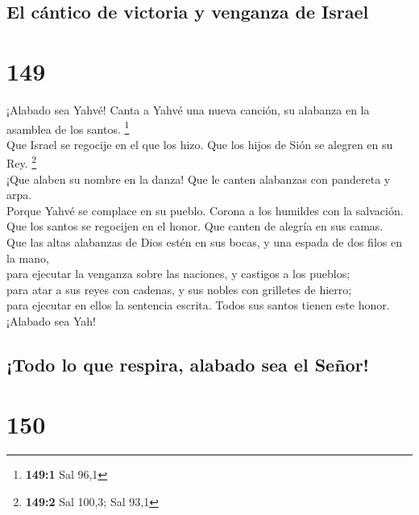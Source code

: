\hypertarget{el-cuxe1ntico-de-victoria-y-venganza-de-israel}{%
\subsection{El cántico de victoria y venganza de
Israel}\label{el-cuxe1ntico-de-victoria-y-venganza-de-israel}}

\hypertarget{section-146}{%
\section{149}\label{section-146}}

 ¡Alabado sea Yahvé! Canta a Yahvé una nueva canción, su
alabanza en la asamblea de los santos. \footnote{\textbf{149:1} Sal 96,1}\\
 Que Israel se regocije en el que los hizo. Que los hijos
de Sión se alegren en su Rey. \footnote{\textbf{149:2} Sal 100,3; Sal
  93,1}\\
 ¡Que alaben su nombre en la danza! Que le canten
alabanzas con pandereta y arpa.\\
 Porque Yahvé se complace en su pueblo. Corona a los
humildes con la salvación.\\
 Que los santos se regocijen en el honor. Que canten de
alegría en sus camas.\\
 Que las altas alabanzas de Dios estén en sus bocas, y una
espada de dos filos en la mano,\\
 para ejecutar la venganza sobre las naciones, y castigos
a los pueblos;\\
 para atar a sus reyes con cadenas, y sus nobles con
grilletes de hierro;\\
 para ejecutar en ellos la sentencia escrita. Todos sus
santos tienen este honor. ¡Alabado sea Yah!

\hypertarget{todo-lo-que-respira-alabado-sea-el-seuxf1or}{%
\subsection{¡Todo lo que respira, alabado sea el
Señor!}\label{todo-lo-que-respira-alabado-sea-el-seuxf1or}}

\hypertarget{section-147}{%
\section{150}\label{section-147}}

